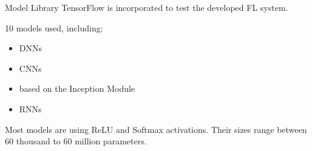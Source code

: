     
    



\begin{frame}{Model Library}
    TensorFlow is incorporated to test the developed FL system.
    
    10 models used, including:\\
    \begin{itemize}
        \item DNNs
        \item CNNs
        \item based on the Inception Module
        \item RNNs
    \end{itemize}
    Most models are using ReLU and Softmax activations. Their sizes range between 60 thousand to 60 million parameters.
\end{frame}

    
    
